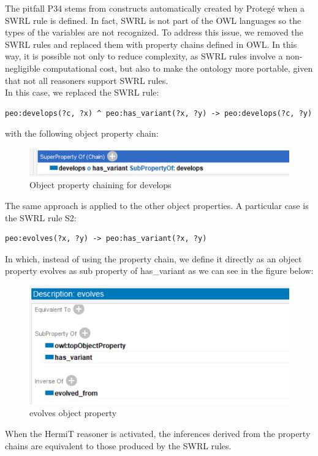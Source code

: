 The pitfall P34 stems from constructs automatically created by Protegé when a SWRL rule is defined.
In fact, SWRL is not part of the OWL languages so the types of the variables are not recognized.
To address this issue, we removed the SWRL rules and replaced them with property chains defined in OWL.
In this way, it is possible not only to reduce complexity, as SWRL rules involve a non-negligible computational cost, but also to make the ontology more portable, given that not all reasoners support SWRL rules.\\
In this case, we replaced the SWRL rule:
\begin{lstlisting}
peo:develops(?c, ?x) ^ peo:has_variant(?x, ?y) -> peo:develops(?c, ?y)
\end{lstlisting}
with the following object property chain:
\begin{figure}[H]
    \centering
    \includegraphics[width=0.7\linewidth]{Figures/fig_81.png}
    \caption{Object property chaining for develops}
    \label{fig:enter-label}
\end{figure}
The same approach is applied to the other object properties. A particular case is the SWRL rule S2: 
\begin{lstlisting}
peo:evolves(?x, ?y) -> peo:has_variant(?x, ?y)
\end{lstlisting}
In which, instead of using the property chain, we define it directly as an object property evolves as sub property of has\_variant as we can see in the figure below:
\begin{figure}[H]
    \centering
    \includegraphics[width=0.9\linewidth]{Figures/fig_82.png}
    \caption{evolves object property}
    \label{fig:enter-label}
\end{figure}
When the HermiT reasoner is activated, the inferences derived from the property chains are equivalent to those produced by the SWRL rules.


